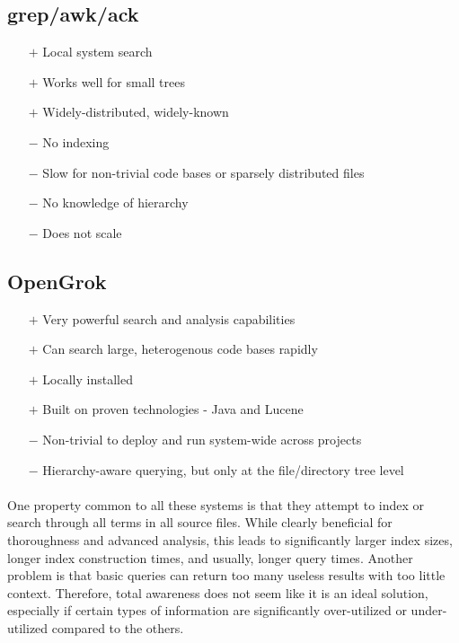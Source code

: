 \documentclass{article}
\begin{document}
\subsection{grep/awk/ack}
	\begin{itemize}
	\item[$+$] Local system search
    \item[$+$] Works well for small trees
    \item[$+$] Widely-distributed, widely-known   
   
    \item[$-$] No indexing
    \item[$-$] Slow for non-trivial code bases or sparsely distributed files
    \item[$-$] No knowledge of hierarchy
    \item[$-$] Does not scale
    \end{itemize}
    
\subsection{OpenGrok}
	\begin{itemize}
    \item[$+$] Very powerful search and analysis capabilities
    \item[$+$] Can search large, heterogenous code bases rapidly
    \item[$+$] Locally installed
    \item[$+$] Built on proven technologies - Java and Lucene
    
    \item[$-$] Non-trivial to deploy and run system-wide across projects
    \item[$-$] Hierarchy-aware querying, but only at the file/directory tree level
	\end{itemize}

\paragraph{}
One property common to all these systems is that they attempt to index or search through all terms in all source files. While clearly beneficial for thoroughness and advanced analysis, this leads to significantly larger index sizes, longer index construction times, and usually, longer query times. Another problem is that basic queries can return too many useless results with too little context. Therefore, total awareness does not seem like it is an ideal solution, especially if certain types of information are significantly over-utilized or under-utilized compared to the others.
\end{document}
